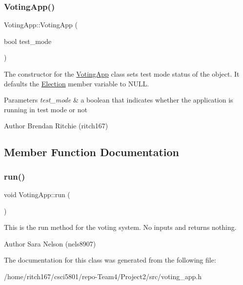 \subsubsection{\texorpdfstring{Voting\+App()}{VotingApp()}}
{\footnotesize\ttfamily Voting\+App\+::\+Voting\+App (\begin{DoxyParamCaption}\item[{bool}]{test\+\_\+mode }\end{DoxyParamCaption})}

The constructor for the \hyperlink{classVotingApp}{Voting\+App} class sets test mode status of the object. It defaults the \hyperlink{classElection}{Election} member variable to N\+U\+LL. 
\begin{DoxyParams}{Parameters}
{\em test\+\_\+mode} & a boolean that indicates whether the application is running in test mode or not \\
\hline
\end{DoxyParams}
\begin{DoxyAuthor}{Author}
Brendan Ritchie (ritch167) 
\end{DoxyAuthor}


\subsection{Member Function Documentation}
\mbox{\label{classVotingApp_a9d62b11e6082588a0b01752f838e0611}} 
\subsubsection{\texorpdfstring{run()}{run()}}
{\footnotesize\ttfamily void Voting\+App\+::run (\begin{DoxyParamCaption}{ }\end{DoxyParamCaption})}

This is the run method for the voting system. No inputs and returns nothing. \begin{DoxyAuthor}{Author}
Sara Nelson (nels8907) 
\end{DoxyAuthor}


The documentation for this class was generated from the following file\+:\begin{DoxyCompactItemize}
\item 
/home/ritch167/csci5801/repo-\/\+Team4/\+Project2/src/voting\+\_\+app.\+h\end{DoxyCompactItemize}
